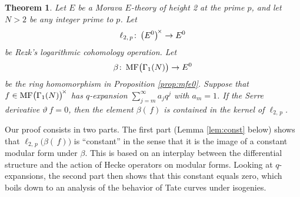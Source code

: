\documentclass{gtpart}
\newtheorem{thm}{Theorem}
\theoremstyle{definition}
\theoremstyle{remark}
\def\co{\colon\thinspace}
\newcommand{\MF}{{\rm MF}}
\newcommand{\B}{\beta}
\newcommand{\G}{\Gamma}
\renewcommand{\=}{\approx}
\renewcommand{\-}{\sim}
\numberwithin{equation}{section}
\numberwithin{thm}{section}
\begin{document}
\begin{thm}
 \label{thm:kerlog}
 Let $E$ be a Morava $E$-theory of height 2 at the prime $p$, and let $N > 2$ be any integer prime to $p$.  
 Let 
 \[
  \ell_{2,\,p} \co \big( E^0 \big)^{\!\times} \to E^0 
 \]
 be Rezk's logarithmic cohomology operation.  
 Let 
 \[
  \B \co \MF\big(\G_1(N)\big) \to E^0 
 \]
 be the ring homomorphism in Proposition \ref{prop:mfe0}.  
 Suppose that \, $f \in \MF\big(\G_1(N)\big)^{\!\times}$ has $q$-expansion $\sum_{j = m}^\infty a_j q^j$ with $a_m = 1$.  
 If the Serre derivative $\vartheta ~\! f = 0$, then 
 the element $\B(\,f)$ is contained in the kernel of $\ell_{2,\,p}$.  
\end{thm}
Our proof consists in two parts.  
The first part (Lemma \ref{lem:const} below) shows that $\ell_{2,\,p}\big(\B(\,f)\big)$ is ``constant'' in the sense that it is the image of a constant modular form under $\B$.  
This is based on an interplay between the differential structure and the action of Hecke operators on modular forms.  
Looking at $q$-expansions, the second part then shows that this constant equals zero, which boils down to an analysis of the behavior of Tate curves under isogenies.  
\end{document}
